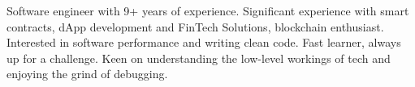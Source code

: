 

\vspace{0mm}
\begin{justify}
  Software engineer with 9+ years of experience.\newline
  Significant experience with smart contracts, dApp development and FinTech Solutions, blockchain enthusiast.\newline
  Interested in software performance and writing clean code.\newline
  Fast learner, always up for a challenge. Keen on understanding the low-level workings of tech and enjoying the grind of debugging.
\end{justify}
\vspace{0mm}